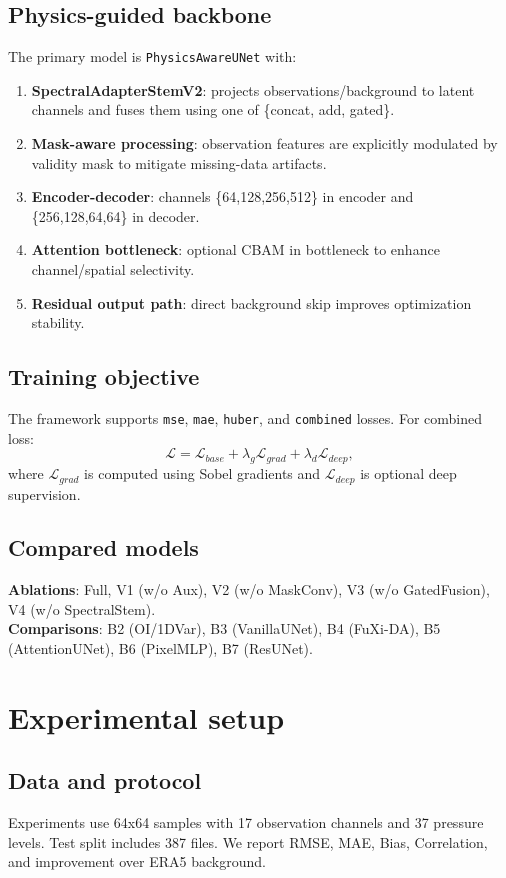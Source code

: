 \documentclass[preprint,12pt]{elsarticle}
\begin{document}
\subsection{Physics-guided backbone}
The primary model is \texttt{PhysicsAwareUNet} with:
\begin{enumerate}[leftmargin=*]
\item \textbf{SpectralAdapterStemV2}: projects observations/background to latent channels and fuses them using one of \{concat, add, gated\}.
\item \textbf{Mask-aware processing}: observation features are explicitly modulated by validity mask to mitigate missing-data artifacts.
\item \textbf{Encoder-decoder}: channels \{64,128,256,512\} in encoder and \{256,128,64,64\} in decoder.
\item \textbf{Attention bottleneck}: optional CBAM in bottleneck to enhance channel/spatial selectivity.
\item \textbf{Residual output path}: direct background skip improves optimization stability.
\end{enumerate}

\subsection{Training objective}
The framework supports \texttt{mse}, \texttt{mae}, \texttt{huber}, and \texttt{combined} losses. For combined loss:
\begin{equation}
\mathcal{L}=\mathcal{L}_{base}+\lambda_g\mathcal{L}_{grad}+\lambda_d\mathcal{L}_{deep},
\end{equation}
where $\mathcal{L}_{grad}$ is computed using Sobel gradients and $\mathcal{L}_{deep}$ is optional deep supervision.

\subsection{Compared models}
\textbf{Ablations}: Full, V1 (w/o Aux), V2 (w/o MaskConv), V3 (w/o GatedFusion), V4 (w/o SpectralStem).\\
\textbf{Comparisons}: B2 (OI/1DVar), B3 (VanillaUNet), B4 (FuXi-DA), B5 (AttentionUNet), B6 (PixelMLP), B7 (ResUNet).

\section{Experimental setup}
\subsection{Data and protocol}
Experiments use 64x64 samples with 17 observation channels and 37 pressure levels. Test split includes 387 files. We report RMSE, MAE, Bias, Correlation, and improvement over ERA5 background.
\end{document}
